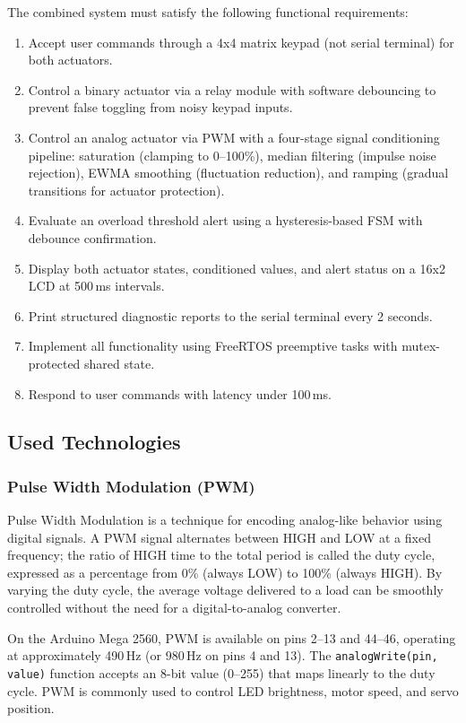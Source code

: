 The combined system must satisfy the following functional requirements:

\begin{enumerate}
    \item Accept user commands through a 4x4 matrix keypad (not serial terminal) for both actuators.
    \item Control a binary actuator via a relay module with software debouncing to prevent false toggling from noisy keypad inputs.
    \item Control an analog actuator via PWM with a four-stage signal conditioning pipeline: saturation (clamping to 0--100\%), median filtering (impulse noise rejection), EWMA smoothing (fluctuation reduction), and ramping (gradual transitions for actuator protection).
    \item Evaluate an overload threshold alert using a hysteresis-based FSM with debounce confirmation.
    \item Display both actuator states, conditioned values, and alert status on a 16x2 LCD at 500\,ms intervals.
    \item Print structured diagnostic reports to the serial terminal every 2 seconds.
    \item Implement all functionality using FreeRTOS preemptive tasks with mutex-protected shared state.
    \item Respond to user commands with latency under 100\,ms.
\end{enumerate}

\subsection{Used Technologies}

\subsubsection{Pulse Width Modulation (PWM)}

Pulse Width Modulation is a technique for encoding analog-like behavior using digital signals. A PWM signal alternates between HIGH and LOW at a fixed frequency; the ratio of HIGH time to the total period is called the duty cycle, expressed as a percentage from 0\% (always LOW) to 100\% (always HIGH). By varying the duty cycle, the average voltage delivered to a load can be smoothly controlled without the need for a digital-to-analog converter.

On the Arduino Mega 2560, PWM is available on pins 2--13 and 44--46, operating at approximately 490\,Hz (or 980\,Hz on pins 4 and 13). The \texttt{analogWrite(pin, value)} function accepts an 8-bit value (0--255) that maps linearly to the duty cycle. PWM is commonly used to control LED brightness, motor speed, and servo position.

